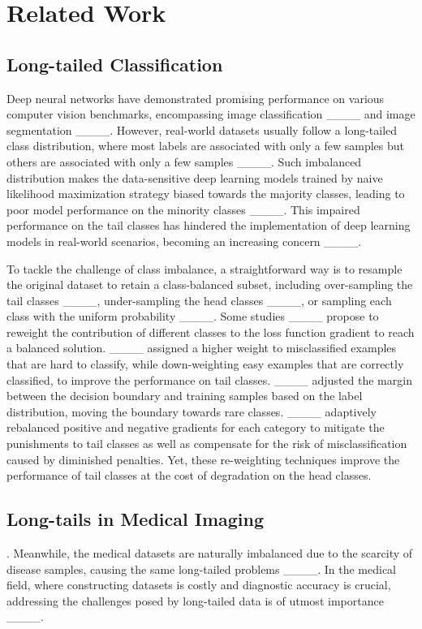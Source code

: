 \section{Related Work}
\subsection{Long-tailed Classification}
Deep neural networks have demonstrated promising performance on various computer vision benchmarks, encompassing image classification  ____ and image segmentation ____.
However, real-world datasets usually follow a long-tailed class distribution, where most labels are associated with only a few samples but others are associated with only a few samples ____. 
Such imbalanced distribution makes the data-sensitive deep learning models trained by naive likelihood maximization strategy biased towards the majority classes, leading to poor model performance on the minority classes ____. This impaired performance on the tail classes has hindered the implementation of deep learning models in real-world scenarios, becoming an increasing concern ____.

To tackle the challenge of class imbalance, a straightforward way is to resample the original dataset to retain a class-balanced subset, including over-sampling the tail classes ____, under-sampling the head classes ____, or sampling each class with the uniform probability ____. Some studies ____ propose to reweight the contribution of different classes to the loss function gradient to reach a balanced solution. ____ assigned a higher weight to misclassified examples that are hard to classify, while down-weighting easy examples that are correctly classified, to improve the performance on tail classes. ____ adjusted the margin between the decision boundary and training samples based on the label distribution, moving the boundary towards rare classes. ____ adaptively rebalanced positive and negative gradients for each category to mitigate the punishments to tail classes as well as compensate for the risk of misclassification caused by diminished penalties.
Yet, these re-weighting techniques improve the performance of tail classes at the cost of degradation on the head classes.


\subsection{Long-tails in Medical Imaging}
.
Meanwhile, the medical datasets are naturally imbalanced due to the scarcity of disease samples, causing the same long-tailed problems ____. In the medical field, where constructing datasets is costly and diagnostic accuracy is crucial, addressing the challenges posed by long-tailed data is of utmost importance ____.

